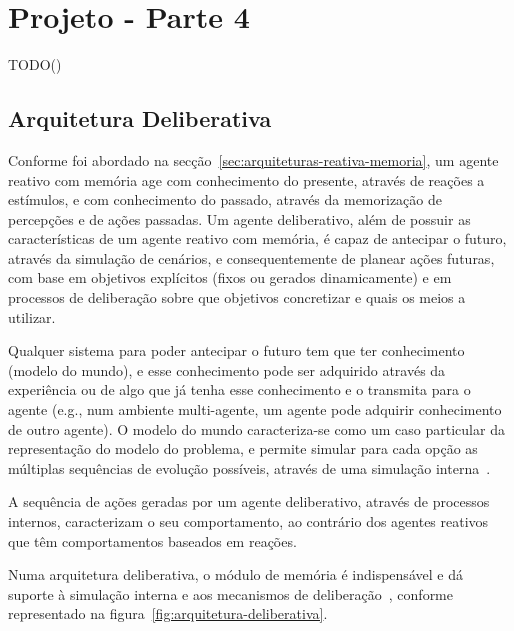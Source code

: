 \chapter{Projeto - Parte 4}\label{ch:projeto-parte4}

TODO()


\section{Arquitetura Deliberativa}\label{sec:arquitetura-deliberativa}

Conforme foi abordado na secção~\ref{sec:arquiteturas-reativa-memoria}, um agente reativo com memória age com conhecimento do presente, através de reações a estímulos, e com conhecimento do passado, através da memorização de percepções e de ações passadas.
Um agente deliberativo, além de possuir as características de um agente reativo com memória, é capaz de antecipar o futuro, através da simulação de cenários, e consequentemente de planear ações futuras, com base em objetivos explícitos (fixos ou gerados dinamicamente) e em processos de deliberação sobre que objetivos concretizar e quais os meios a utilizar.

Qualquer sistema para poder antecipar o futuro tem que ter conhecimento (modelo do mundo), e esse conhecimento pode ser adquirido através da experiência ou de algo que já tenha esse conhecimento e o transmita para o agente (e.g., num ambiente multi-agente, um agente pode adquirir conhecimento de outro agente).
O modelo do mundo caracteriza-se como um caso particular da representação do modelo do problema, e permite simular para cada opção as múltiplas sequências de evolução possíveis, através de uma simulação interna~\cite{isel:iasa:slides:arq-agentes-deliberativos}.

A sequência de ações geradas por um agente deliberativo, através de processos internos, caracterizam o seu comportamento, ao contrário dos agentes reativos que têm comportamentos baseados em reações.

Numa arquitetura deliberativa, o módulo de memória é indispensável e dá suporte à simulação interna e aos mecanismos de deliberação~\cite{isel:iasa:slides:arq-agentes-deliberativos}, conforme representado na figura~\ref{fig:arquitetura-deliberativa}.


